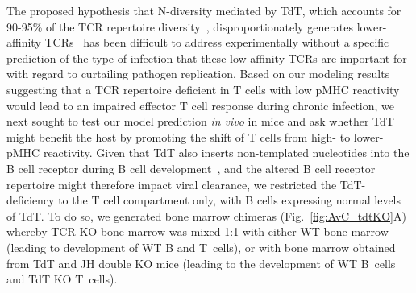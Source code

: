 The proposed hypothesis that N-diversity mediated by TdT, which accounts for 90-95\% of the TCR repertoire diversity~\cite{cabaniols2001most}, disproportionately generates lower-affinity TCRs~\cite{vrisekoop2014revisiting} has been difficult to address experimentally without a specific prediction of the type of infection that these low-affinity TCRs are important for with regard to curtailing pathogen replication. Based on our modeling results suggesting that a TCR repertoire deficient in T cells with low pMHC reactivity would lead to an impaired effector T cell response during chronic infection, we next sought to test our model prediction \textit{in vivo} in mice and ask whether TdT might benefit the host by promoting the shift of T cells from high- to lower-pMHC reactivity. Given that TdT also inserts non-templated nucleotides into the B cell receptor during B cell development~\cite{jackson2013shape}, and the altered B cell receptor repertoire might therefore impact viral clearance, we restricted the TdT-deficiency to the T cell compartment only, with B cells expressing normal levels of TdT. To do so, we generated bone marrow chimeras (Fig.~\ref{fig:AvC_tdtKO}A) whereby TCR\textbeta{} KO bone marrow was mixed 1:1 with either WT bone marrow (leading to development of WT B and T~cells), or with bone marrow obtained from TdT and JH double KO mice (leading to the development of WT B~cells and TdT KO T~cells).%
%
